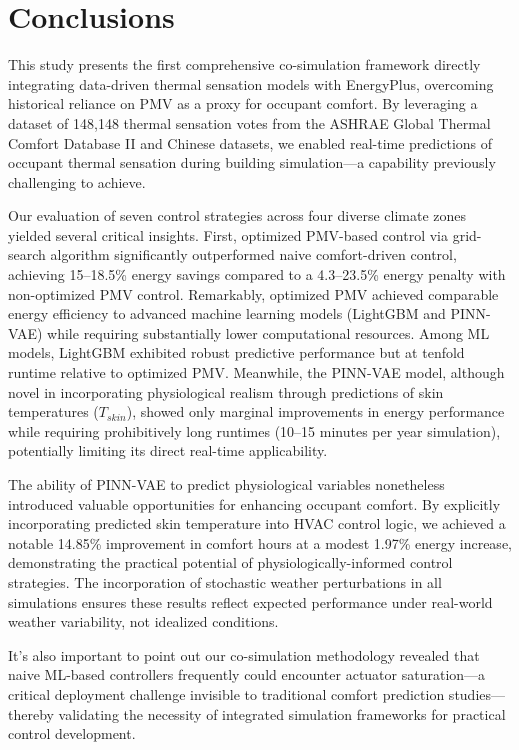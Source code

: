 \section{Conclusions}
This study presents the first comprehensive co-simulation framework directly integrating data-driven thermal sensation models with EnergyPlus, overcoming historical reliance on PMV as a proxy for occupant comfort. By leveraging a dataset of 148,148 thermal sensation votes from the ASHRAE Global Thermal Comfort Database II and Chinese datasets, we enabled real-time predictions of occupant thermal sensation during building simulation—a capability previously challenging to achieve.

Our evaluation of seven control strategies across four diverse climate zones yielded several critical insights. First, optimized PMV-based control via grid-search algorithm significantly outperformed naive comfort-driven control, achieving 15–18.5\% energy savings compared to a 4.3–23.5\% energy penalty with non-optimized PMV control. Remarkably, optimized PMV achieved comparable energy efficiency to advanced machine learning models (LightGBM and PINN-VAE) while requiring substantially lower computational resources. Among ML models, LightGBM exhibited robust predictive performance but at tenfold runtime relative to optimized PMV. Meanwhile, the PINN-VAE model, although novel in incorporating physiological realism through predictions of skin temperatures ($T_{skin}$), showed only marginal improvements in energy performance while requiring prohibitively long runtimes (10–15 minutes per year simulation), potentially limiting its direct real-time applicability.

The ability of PINN-VAE to predict physiological variables nonetheless introduced valuable opportunities for enhancing occupant comfort. By explicitly incorporating predicted skin temperature into HVAC control logic, we achieved a notable 14.85\% improvement in comfort hours at a modest 1.97\% energy increase, demonstrating the practical potential of physiologically-informed control strategies. The incorporation of stochastic weather perturbations in all simulations ensures these results reflect expected performance under real-world weather variability, not idealized conditions.

It's also important to point out our co-simulation methodology revealed that naive ML-based controllers frequently could encounter actuator saturation—a critical deployment challenge invisible to traditional comfort prediction studies—thereby validating the necessity of integrated simulation frameworks for practical control development.

